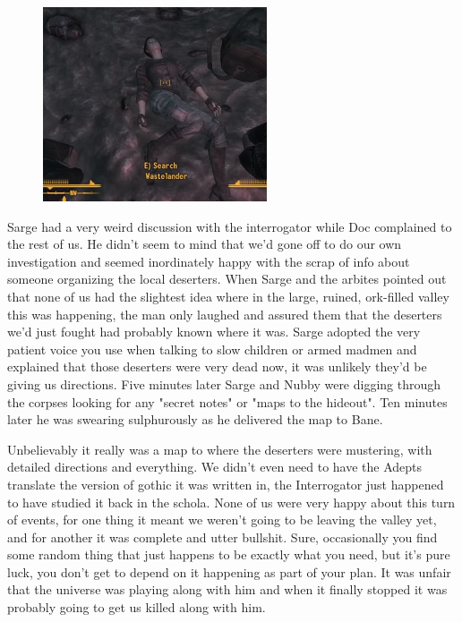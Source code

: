 \begin{figure}
	\begin{center}
		\includegraphics[width=\figwidth]{pics/9/21.png}
	\end{center}
\end{figure}
Sarge had a very weird discussion with the interrogator while Doc complained to the rest of us. 
He didn't seem to mind that we'd gone off to do our own investigation and seemed inordinately happy with the scrap of info about someone organizing the local deserters. 
When Sarge and the arbites pointed out that none of us had the slightest idea where in the large, ruined, ork-filled valley this was happening, the man only laughed and assured them that the deserters we'd just fought had probably known where it was. 
Sarge adopted the very patient voice you use when talking to slow children or armed madmen and explained that those deserters were very dead now, it was unlikely they'd be giving us directions. 
Five minutes later Sarge and Nubby were digging through the corpses looking for any "secret notes" or "maps to the hideout". 
Ten minutes later he was swearing sulphurously as he delivered the map to Bane.

Unbelievably it really was a map to where the deserters were mustering, with detailed directions and everything. 
We didn't even need to have the Adepts translate the version of gothic it was written in, the Interrogator just happened to have studied it back in the schola. 
None of us were very happy about this turn of events, for one thing it meant we weren't going to be leaving the valley yet, and for another it was complete and utter bullshit. 
Sure, occasionally you find some random thing that just happens to be exactly what you need, but it's pure luck, you don't get to depend on it happening as part of your plan. 
It was unfair that the universe was playing along with him and when it finally stopped it was probably going to get us killed along with him.

